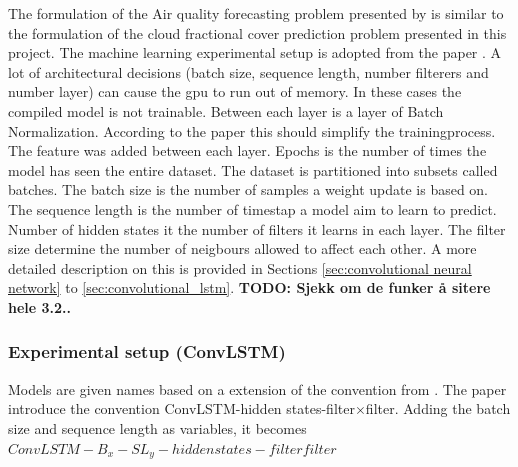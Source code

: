 The formulation of the Air quality forecasting problem presented by  \citeauthor{SunAirLSTM} is similar to the formulation of the cloud fractional cover prediction problem presented in this project. The machine learning experimental setup is adopted from the paper . 
A lot of architectural decisions (batch size, sequence length, number filterers and number layer) can cause the \acrshort{gpu} to run out of memory. In these cases the compiled model is not trainable. Between each layer is a layer of Batch Normalization. According to the paper  this should simplify the trainingprocess. The feature was added between each layer. Epochs is the number of times the model has seen the entire dataset. The dataset is partitioned into subsets called batches. The batch size is the number of samples a weight update is based on. The sequence length is the number of timestap a model aim to learn to predict. Number of hidden states it the number of filters it learns in each layer. The filter size determine the number of neigbours allowed to affect each other. A more detailed description on this is provided in Sections \ref{sec:convolutional neural network} to 
\ref{sec:convolutional_lstm}. \textbf{TODO: Sjekk om de funker å sitere hele 3.2..}

\subsubsection{Experimental setup (ConvLSTM)}
Models are given names based on a extension of the convention from . The paper introduce the convention ConvLSTM-hidden states-filter$\times$filter. Adding the batch size and sequence length as variables, it becomes \newline $ConvLSTM-B_{x}-SL_{y}-hidden states-filter$\times$filter$

